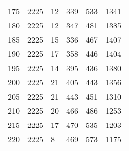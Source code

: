 \begin{longtable}{|l|l|l|l|l|l|}
175 & 2225 & 12 & 339 & 533 & 1341 \\
180 & 2225 & 12 & 347 & 481 & 1385 \\
185 & 2225 & 15 & 336 & 467 & 1407 \\
190 & 2225 & 17 & 358 & 446 & 1404 \\
195 & 2225 & 14 & 395 & 436 & 1380 \\
200 & 2225 & 21 & 405 & 443 & 1356 \\
205 & 2225 & 21 & 443 & 451 & 1310 \\
210 & 2225 & 20 & 466 & 486 & 1253 \\
215 & 2225 & 17 & 470 & 535 & 1203 \\
220 & 2225 & 8 & 469 & 573 & 1175 \\

	
	\bottomrule
\end{longtable}




